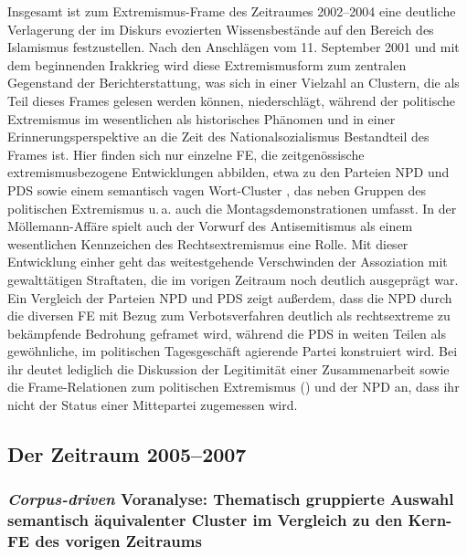 Insgesamt ist zum Extremismus-Frame des Zeitraumes 2002--2004 eine deutliche Verlagerung der im Diskurs evozierten Wissensbestände auf den Bereich des Islamismus festzustellen. Nach den Anschlägen vom 11. September 2001 und mit dem beginnenden Irakkrieg wird diese Extremismusform zum zentralen Gegenstand der Berichterstattung, was sich in einer Vielzahl an Clustern, die als Teil dieses Frames gelesen werden können, niederschlägt, während der politische Extremismus im wesentlichen als historisches Phänomen und in einer Erinnerungsperspektive an die Zeit des Nationalsozialismus Bestandteil des Frames ist. Hier finden sich nur einzelne FE, die zeitgenössische extremismusbezogene Entwicklungen abbilden, etwa zu den Parteien NPD und PDS sowie einem semantisch vagen Wort-Cluster , das neben Gruppen des politischen Extremismus u.\,a. auch die Montagsdemonstrationen umfasst. In der Möllemann-Affäre spielt auch der Vorwurf des Antisemitismus als einem wesentlichen Kennzeichen des Rechtsextremismus eine Rolle. Mit dieser Entwicklung einher geht das weitestgehende Verschwinden der Assoziation mit gewalttätigen Straftaten, die im vorigen Zeitraum noch deutlich ausgeprägt war. Ein Vergleich der Parteien NPD und PDS zeigt außerdem, dass die NPD durch die diversen FE mit Bezug zum Verbotsverfahren deutlich als rechtsextreme zu bekämpfende Bedrohung geframet wird, während die PDS in weiten Teilen als gewöhnliche, im politischen Tagesgeschäft agierende Partei konstruiert wird. Bei ihr deutet lediglich die Diskussion der Legitimität einer Zusammenarbeit sowie die Frame-Relationen zum politischen Extremismus () und der NPD an, dass ihr nicht der Status einer Mittepartei zugemessen wird.

\subsection{Der Zeitraum 2005--2007}\label{der-zeitraum-2005-2007}

\subsubsection{\texorpdfstring{\emph{Corpus-driven} Voranalyse: Thematisch gruppierte Auswahl semantisch äquivalenter Cluster im Vergleich zu den Kern-FE des vorigen Zeitraums}{Corpus-driven Voranalyse: Thematisch gruppierte Auswahl semantisch äquivalenter Cluster im Vergleich zu den Kern-FE des vorigen Zeitraums}}\label{corpus-driven-voranalyse-thematisch-gruppierte-auswahl-semantisch-aequivalenter-cluster-im-vergleich-zu-den-kern-fe-des-vorigen-zeitraums-1}

